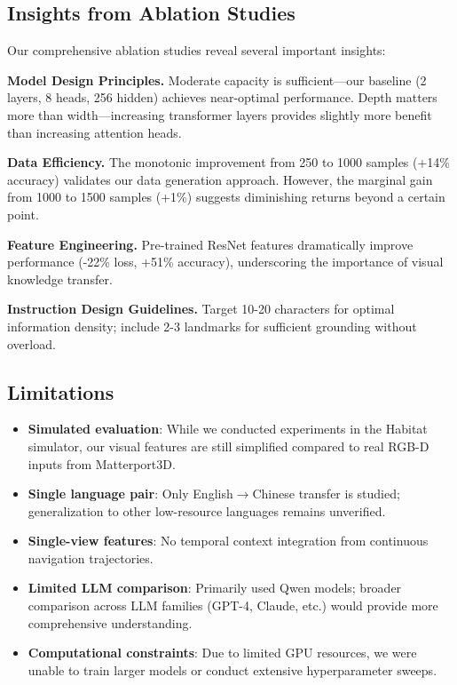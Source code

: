\documentclass[11pt,a4paper]{article}
\begin{document}
\subsection{Insights from Ablation Studies}

Our comprehensive ablation studies reveal several important insights:

\noindent\textbf{Model Design Principles.} Moderate capacity is sufficient---our baseline (2 layers, 8 heads, 256 hidden) achieves near-optimal performance. Depth matters more than width---increasing transformer layers provides slightly more benefit than increasing attention heads.

\noindent\textbf{Data Efficiency.} The monotonic improvement from 250 to 1000 samples (+14\% accuracy) validates our data generation approach. However, the marginal gain from 1000 to 1500 samples (+1\%) suggests diminishing returns beyond a certain point.

\noindent\textbf{Feature Engineering.} Pre-trained ResNet features dramatically improve performance (-22\% loss, +51\% accuracy), underscoring the importance of visual knowledge transfer.

\noindent\textbf{Instruction Design Guidelines.} Target 10-20 characters for optimal information density; include 2-3 landmarks for sufficient grounding without overload.

\subsection{Limitations}

\begin{itemize}
    \item \textbf{Simulated evaluation}: While we conducted experiments in the Habitat simulator, our visual features are still simplified compared to real RGB-D inputs from Matterport3D.
    \item \textbf{Single language pair}: Only English$\rightarrow$Chinese transfer is studied; generalization to other low-resource languages remains unverified.
    \item \textbf{Single-view features}: No temporal context integration from continuous navigation trajectories.
    \item \textbf{Limited LLM comparison}: Primarily used Qwen models; broader comparison across LLM families (GPT-4, Claude, etc.) would provide more comprehensive understanding.
    \item \textbf{Computational constraints}: Due to limited GPU resources, we were unable to train larger models or conduct extensive hyperparameter sweeps.
\end{itemize}
\end{document}
